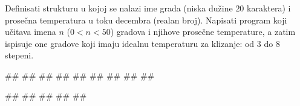 \begin{Exercise}[label=struc.3] 
Definisati strukturu  u kojoj se nalazi ime grada (niska
dužine $20$ karaktera) i prosečna temperatura u toku decembra (realan
broj). Napisati program koji učitava imena $n$ ($0<n<50$) gradova i
njihove prosečne temperature, a zatim ispisuje one gradove koji imaju
idealnu temperaturu za klizanje: od $3$ do $8$
stepeni. 

\begin{maxitest}
\begin{upotreba}{1}
#\naslovInt#
##
##
##
##
##
##
##
##
\end{upotreba}
\end{maxitest}

\begin{maxitest}
\begin{upotreba}{2}
#\naslovInt#
##
##
##
##
\end{upotreba}
\end{maxitest}
 
\end{Exercise}
\ifresenja
\begin{Answer}[ref=struc.3]
\end{Answer}
\fi


